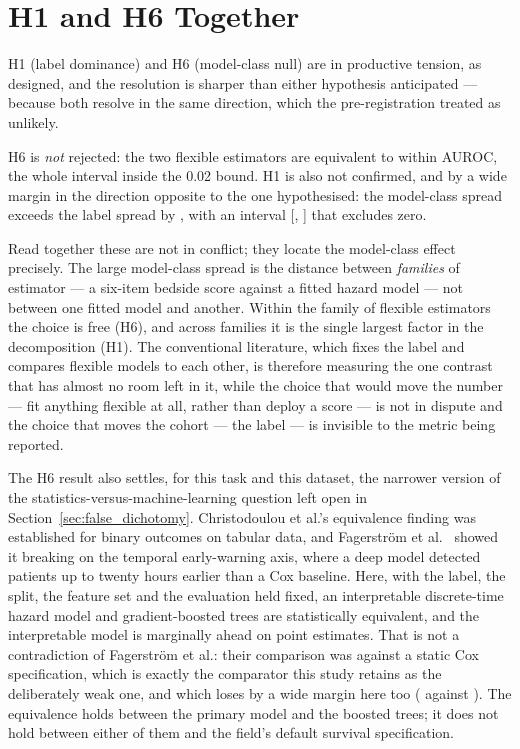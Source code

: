 \section{H1 and H6 Together}
\label{sec:discussion_h1h6}

H1 (label dominance) and H6 (model-class null) are in productive tension, as
designed, and the resolution is sharper than either hypothesis anticipated ---
because both resolve in the same direction, which the pre-registration treated
as unlikely.

H6 is \emph{not} rejected: the two flexible estimators are equivalent to within
\pcHSixEst{} AUROC, the whole interval inside the 0.02 bound. H1 is also not
confirmed, and by a wide margin in the direction opposite to the one
hypothesised: the model-class spread \pcSpreadModelClass{} exceeds the label
spread \pcSpreadLabel{} by \pcHOneEst, with an interval
[\pcHOneCiLo, \pcHOneCiHi] that excludes zero.

Read together these are not in conflict; they locate the model-class effect
precisely. The large model-class spread is the distance between \emph{families}
of estimator --- a six-item bedside score against a fitted hazard model --- not
between one fitted model and another. Within the family of flexible estimators
the choice is free (H6), and across families it is the single largest factor in
the decomposition (H1). The conventional literature, which fixes the label and
compares flexible models to each other, is therefore measuring the one contrast
that has almost no room left in it, while the choice that would move the number
--- fit anything flexible at all, rather than deploy a score --- is not in
dispute and the choice that moves the cohort --- the label --- is invisible to
the metric being reported.

The H6 result also settles, for this task and this dataset, the narrower
version of the statistics-versus-machine-learning question left open in
Section~\ref{sec:false_dichotomy}. Christodoulou et al.'s
\cite{christodoulou2019cox} equivalence finding was established for binary
outcomes on tabular data, and Fagerstr{\"o}m et al.\ \cite{fagerstrom2019lisep}
showed it breaking on the temporal early-warning axis, where a deep model
detected patients up to twenty hours earlier than a Cox baseline. Here, with
the label, the split, the feature set and the evaluation held fixed, an
interpretable discrete-time hazard model and gradient-boosted trees are
statistically equivalent, and the interpretable model is marginally ahead on
point estimates. That is not a contradiction of Fagerstr{\"o}m et al.: their
comparison was against a static Cox specification, which is exactly the
comparator this study retains as the deliberately weak one, and which loses by
a wide margin here too (\pcAurocCoxB{} against \pcAurocPrimaryB). The
equivalence holds between the primary model and the boosted trees; it does not
hold between either of them and the field's default survival specification.

